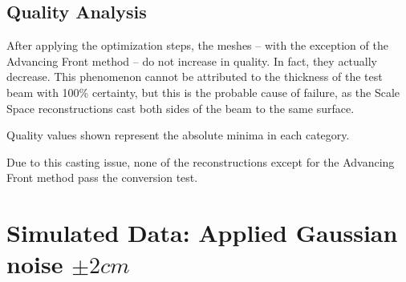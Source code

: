 \documentclass[12pt]{drexelthesis}
\let\Oldsection\section
\renewcommand{\section}{\FloatBarrier\Oldsection}
\let\Oldsubsection\subsection
\renewcommand{\subsection}{\FloatBarrier\Oldsubsection}
\begin{document}
\subsection{Quality Analysis}

After applying the optimization steps, the meshes -- with the exception of the Advancing Front method -- do not increase in quality. In fact, they actually decrease. This phenomenon cannot be attributed to the thickness of the test beam with 100\% certainty, but this is the probable cause of failure, as the Scale Space reconstructions cast both sides of the beam to the same surface.

\begin{table}[!ht]
	\centering
		\caption[Zero noise mesh exit quality]{Exit quality analysis of simulated zero noise surface mesh}
	Quality values shown represent the absolute minima in each category.
	\label{table:0noisequality}
\end{table}

Due to this casting issue, none of the reconstructions except for the Advancing Front method pass the conversion test.











\section{Simulated Data: Applied Gaussian noise $\pm 2 cm$}
\end{document}
